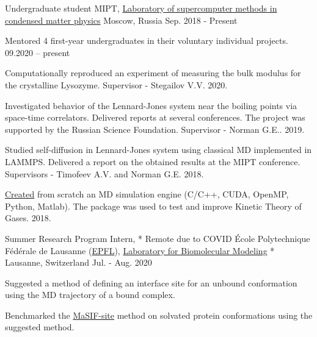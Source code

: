 

\begin{cventries}

  \cventry
    {Undergraduate student} %
    {MIPT, \href{http://en.smcmp.ru/}{Laboratory of supercomputer methods
in condensed matter physics}} %
    {Moscow, Russia} %
    {Sep. 2018 - Present} %
    {
      \begin{cvitems} %
        \item {\textsf{Mentored 4} first-year \textsf{undergraduates} in their voluntary individual projects. 09.2020 -- present}
        \item {Computationally reproduced an experiment of measuring the bulk modulus for the \textsf{crystalline Lysozyme}. Supervisor - Stegailov V.V. 2020.}
        \item {Investigated behavior of the \textsf{Lennard-Jones system} near the boiling points via space-time correlators. Delivered reports at \textsf{several conferences}. The project was supported by the Russian Science Foundation. Supervisor - Norman G.E.. 2019.}
      	\item {Studied self-diffusion in Lennard-Jones system using classical MD implemented in \textsf{LAMMPS}. Delivered a report on the obtained results at the MIPT conference. Supervisors - Timofeev A.V. and Norman G.E. 2018.}
      	\item {\href{https://github.com/PolyachenkoYA/molecules}{Created} from scratch an MD simulation engine (\textsf{C/C++, CUDA, OpenMP, Python, Matlab}). The package was used to test and improve Kinetic Theory of Gases.  2018.}
      \end{cvitems}
    }
    
  \cventry
    {Summer Research Program Intern, * Remote due to COVID} %
    {École Polytechnique Fédérale de Lausanne (\href{https://www.epfl.ch/en/}{EPFL}), \hspace{5pt}  \href{https://www.epfl.ch/labs/lbm/}{Laboratory for Biomolecular Modeling}} %
    {* Lausanne, Switzerland} %
    {Jul. - Aug. 2020} %
    {
      \begin{cvitems} %
		\item{Suggested a method of defining an interface site for an unbound conformation using the MD trajectory of a bound complex.}
        \item {Benchmarked the \href{https://www.nature.com/articles/s41592-019-0666-6}{MaSIF-site} method on solvated protein conformations using the suggested method.}
      \end{cvitems}
    }
    

\end{cventries}
